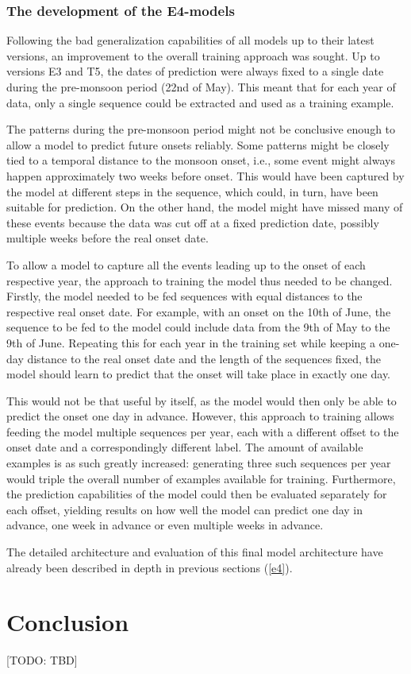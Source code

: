 \subsubsection{The development of the E4-models}
\label{sst:nn_e4}
Following the bad generalization capabilities of all models up to their latest versions, an improvement to the overall training approach was sought. Up to versions E3 and T5, the dates of prediction were always fixed to a single date during the pre-monsoon period (22nd of May). This meant that for each year of data, only a single sequence could be extracted and used as a training example.

The patterns during the pre-monsoon period might not be conclusive enough to allow a model to predict future onsets reliably. Some patterns might be closely tied to a temporal distance to the monsoon onset, i.e., some event might always happen approximately two weeks before onset. This would have been captured by the model at different steps in the sequence, which could, in turn, have been suitable for prediction. On the other hand, the model might have missed many of these events because the data was cut off at a fixed prediction date, possibly multiple weeks before the real onset date.

To allow a model to capture all the events leading up to the onset of each respective year, the approach to training the model thus needed to be changed. Firstly, the model needed to be fed sequences with equal distances to the respective real onset date. For example, with an onset on the 10th of June, the sequence to be fed to the model could include data from the 9th of May to the 9th of June. Repeating this for each year in the training set while keeping a one-day distance to the real onset date and the length of the sequences fixed, the model should learn to predict that the onset will take place in exactly one day.

This would not be that useful by itself, as the model would then only be able to predict the onset one day in advance. However, this approach to training allows feeding the model multiple sequences per year, each with a different offset to the onset date and a correspondingly different label. The amount of available examples is as such greatly increased: generating three such sequences per year would triple the overall number of examples available for training. Furthermore, the prediction capabilities of the model could then be evaluated separately for each offset, yielding results on how well the model can predict one day in advance, one week in advance or even multiple weeks in advance.

The detailed architecture and evaluation of this final model architecture have already been described in depth in previous sections (\cref{e4}).

\section{Conclusion}
[TODO: TBD]
